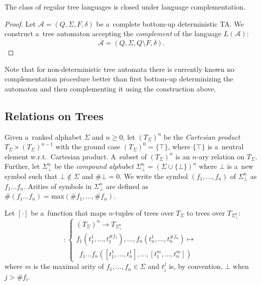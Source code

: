 \begin{theorem}
 The class of regular tree languages is closed under language complementation.
\end{theorem}

\begin{proof}
Let $\mathcal{A} = (Q, \Sigma, F, \delta)$ be a~complete bottom-up deterministic
TA. We construct a~tree automaton accepting the \emph{complement} of the
language $L(\mathcal{A})$:
\begin{equation}
\overline{\mathcal{A}} = (Q, \Sigma, Q \setminus F, \delta).
\end{equation}
\end{proof}

Note that for non-deterministic tree automata there is currently known no
complementation procedure better than first bottom-up determinizing the
automaton and then complementing it using the construction above.

 \subsection{Relations on Trees}

Given a~ranked alphabet $\Sigma$ and $n \geq 0$, let $(T_\Sigma)^n$ be the
\emph{Cartesian product} $T_\Sigma \times (T_\Sigma)^{n-1}$ with the ground case
$(T_\Sigma)^0 = \{\top\}$, where $\{\top\}$ is a~neutral element w.r.t.\ 
Cartesian product. A~subset of $(T_\Sigma)^n$ is an $n$-ary relation on
$T_\Sigma$. Further, let $\Sigma^n_\bot$ be the \emph{compound alphabet}
$\Sigma_\bot^n = (\Sigma \cup \{\bot\})^n$ where $\bot$ is a~new symbol such
that $\bot \notin \Sigma$ and $\#\bot = 0$. We write the symbol
$(f_1,\ldots,f_n)$ of $\Sigma_\bot^n$ as $f_1\ldots f_n$. Arities of symbols in
$\Sigma_\bot^n$ are defined as $\#(f_1\ldots f_n) =
\text{max}(\#f_1,\ldots,\#f_n)$.

Let $[\cdot]$ be a~function that maps $n$-tuples of trees over $T_\Sigma$ to
trees over $T_{\Sigma_\bot^n}$:
\begin{equation}
    [\cdot] :
    \begin{cases}
     (T_\Sigma)^n \rightarrow T_{\Sigma^n_\bot}\\
		 f_1(t_1^1,\ldots,t^{\#f_1}_1),\ldots,f_n(t_n^1,\ldots,t^{\#f_n}_n) \mapsto\\
		 \ \ f_1\ldots f_n([t_1^1,\ldots,t_n^1],\ldots,[t_1^m,\ldots,t_n^m])
   \end{cases}
\end{equation}
 where $m$ is the maximal arity of $f_1,\ldots,f_n \in \Sigma$ and $t_i^j$ is,
 by convention, $\bot$ when $j > \#f_i$.

